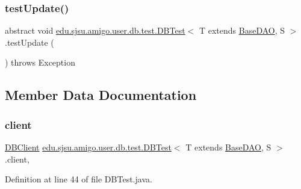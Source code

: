 \subsubsection{\texorpdfstring{test\+Update()}{testUpdate()}}
{\footnotesize\ttfamily abstract void \hyperlink{classedu_1_1sjsu_1_1amigo_1_1user_1_1db_1_1test_1_1_d_b_test}{edu.\+sjsu.\+amigo.\+user.\+db.\+test.\+D\+B\+Test}$<$ T extends \hyperlink{interfaceedu_1_1sjsu_1_1amigo_1_1db_1_1common_1_1_base_d_a_o}{Base\+D\+AO}, S $>$.test\+Update (\begin{DoxyParamCaption}{ }\end{DoxyParamCaption}) throws Exception\hspace{0.3cm}{\ttfamily [abstract]}}



\subsection{Member Data Documentation}
\mbox{\label{classedu_1_1sjsu_1_1amigo_1_1user_1_1db_1_1test_1_1_d_b_test_a4d0a05dcef840b1759f95cb43bb1cb99}} 
\subsubsection{\texorpdfstring{client}{client}}
{\footnotesize\ttfamily \hyperlink{interfaceedu_1_1sjsu_1_1amigo_1_1db_1_1common_1_1_d_b_client}{D\+B\+Client} \hyperlink{classedu_1_1sjsu_1_1amigo_1_1user_1_1db_1_1test_1_1_d_b_test}{edu.\+sjsu.\+amigo.\+user.\+db.\+test.\+D\+B\+Test}$<$ T extends \hyperlink{interfaceedu_1_1sjsu_1_1amigo_1_1db_1_1common_1_1_base_d_a_o}{Base\+D\+AO}, S $>$.client\hspace{0.3cm}{\ttfamily [static]}, {\ttfamily [protected]}}



Definition at line 44 of file D\+B\+Test.\+java.

\mbox{\label{classedu_1_1sjsu_1_1amigo_1_1user_1_1db_1_1test_1_1_d_b_test_abe7d8e01886d915d725ff0cc9a971bba}} 
